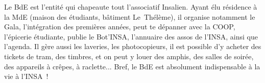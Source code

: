 Le BdE est l'entité qui chapeaute tout l'associatif Insalien. Ayant élu résidence à
la MdE (maison des étudiants, bâtiment Le~Thélème), il organise notamment le
Gala, l'intégration des premières années, peut te dépanner avec la COOP, l'épicerie
étudiante, publie le Bot'INSA, l'annuaire des assos de l'INSA, ainsi que l'agenda.
Il gère aussi les laveries, les photocopieurs, il est possible d'y acheter des
tickets de tram, des timbres, et on peut y louer des amphis, des salles de soirée,
des appareils à crêpes, à raclette...
Bref, le BdE est absolument indispensable à la vie à l'INSA~!

